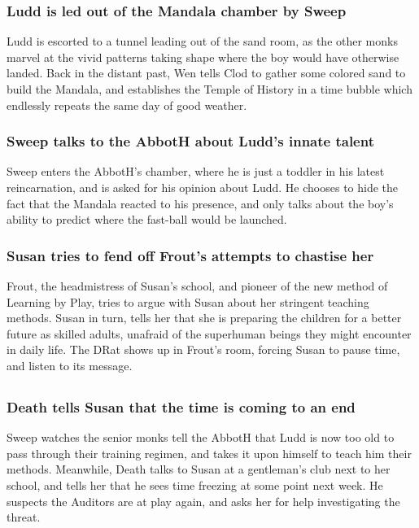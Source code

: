 \subsubsection{\Gls{Ludd} is led out of the Mandala chamber by \Gls{Sweep}}
\Gls{Ludd} is escorted to a tunnel leading out of the sand room, as the other monks marvel at the
vivid patterns taking shape where the boy would have otherwise landed. Back in the distant past,
\Gls{Wen} tells \Gls{Clod} to gather some colored sand to build the Mandala, and establishes the
Temple of History in a time bubble which endlessly repeats the same day of good weather.

\subsubsection{\Gls{Sweep} talks to the \Gls{AbbotH} about \Gls{Ludd}'s innate talent}
\Gls{Sweep} enters the \Gls{AbbotH}'s chamber, where he is just a toddler in his latest
reincarnation, and is asked for his opinion about \Gls{Ludd}. He chooses to hide the fact that
the Mandala reacted to his presence, and only talks about the boy's ability to predict where the
fast-ball would be launched.

\subsubsection{\Gls{Susan} tries to fend off \Gls{Frout}'s attempts to chastise her}
\Gls{Frout}, the headmistress of \Gls{Susan}'s school, and pioneer of the new method of Learning
by Play, tries to argue with \Gls{Susan} about her stringent teaching methods. \Gls{Susan} in turn,
tells her that she is preparing the children for a better future as skilled adults, unafraid of
the superhuman beings they might encounter in daily life. The \Gls{DRat} shows up in \Gls{Frout}'s
room, forcing \Gls{Susan} to pause time, and listen to its message.

\subsection{}
\subsubsection{\Gls{Death} tells \Gls{Susan} that the time is coming to an end}
\Gls{Sweep} watches the senior monks tell the \Gls{AbbotH} that \Gls{Ludd} is now too old to pass
through their training regimen, and takes it upon himself to teach him their methods. Meanwhile,
\Gls{Death} talks to \Gls{Susan} at a gentleman's club next to her school, and tells her that he
sees time freezing at some point next week. He suspects the Auditors are at play again, and asks
her for help investigating the threat.

